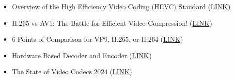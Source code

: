 \documentclass[a4paper,12pt, oneside]{article}
\begin{document}
\begin{multicols}{2}
\begin{itemize}[label={}]
    \item Overview of the High Efficiency Video Coding
        (HEVC) Standard (\href{https://iphome.hhi.de/wiegand/assets/pdfs/2012_12_IEEE-HEVC-Overview.pdf}{LINK})
    \item H.265 vs AV1: The Battle for Efficient Video Compression! (\href{https://subclassy.github.io/compression}{LINK})
    \item 6 Points of Comparison for VP9, H.265, or H.264 (\href{https://www.red5.net/blog/6-points-of-comparison-for-vp9-or-h265/}{LINK})
    \item Hardware Based Decoder and Encoder (\href{https://developer.nvidia.com/video-codec-sdk}{LINK})
    \item The State of Video Codecs 2024 (\href{https://www.streamingmedia.com/Articles/ReadArticle.aspx?ArticleID=163422}{LINK})
\end{itemize}
\end{multicols}
\end{document}
